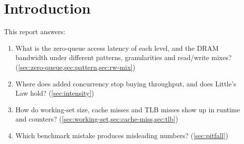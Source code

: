 \section{Introduction}\label{sec:intro}


This report answers:
\begin{enumerate}
  \item What is the zero-queue access latency of each level, and the DRAM bandwidth under different
        patterns, granularities and read/write mixes? (\cref{sec:zero-queue,sec:pattern,sec:rw-mix})
  \item Where does added concurrency stop buying throughput, and does Little's Law hold? (\cref{sec:intensity})
  \item How do working-set size, cache misses and TLB misses show up in runtime and counters?
        (\cref{sec:working-set,sec:cache-miss,sec:tlb})
  \item Which benchmark mistake produces misleading numbers? (\cref{sec:pitfall})
\end{enumerate}

